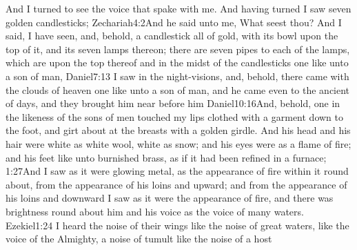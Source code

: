 And I turned to see the voice that spake with me. And having turned I saw seven golden candlesticks;%
	{Zechariah}{4:2}{And he said unto me, What seest thou? And I said, I have seen, and, behold, a candlestick all of gold, with its bowl upon the top of it, and its seven lamps thereon; there are seven pipes to each of the lamps, which are upon the top thereof}
and in the midst of the candlesticks one like unto a son of man,%
%
			{Daniel}{7:13}{ I saw in the night-visions, and, behold, there came with the clouds of heaven one like unto a son of man, and he came even to the ancient of days, and they brought him near before him}%
			{Daniel}{10:16}{And, behold, one in the likeness of the sons of men touched my lips}%
clothed with a garment down to the foot, and girt about at the breasts with a golden girdle.%
And his head and his hair were white as white wool, white as snow;%
and his eyes were as a flame of fire; %
and his feet like unto burnished brass, as if it had been refined in a furnace;%
			{1:27}{And I saw as it were glowing metal, as the appearance of fire within it round about, from the appearance of his loins and upward; and from the appearance of his loins and downward I saw as it were the appearance of fire, and there was brightness round about him}%
and his voice as the voice of many waters.%
        		{Ezekiel}{1:24}{ I heard the noise of their wings like the noise of great waters, like the voice of the Almighty, a noise of tumult like the noise of a host}
